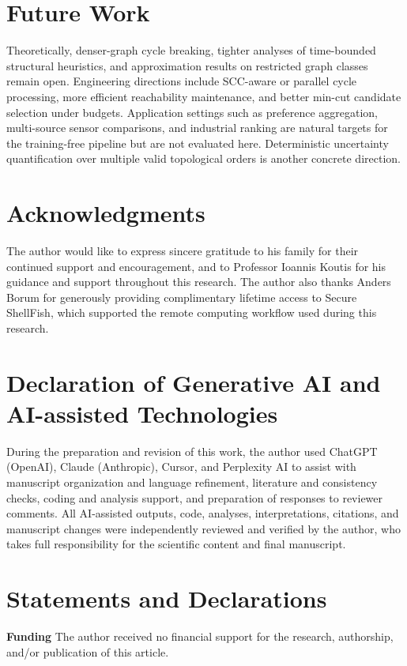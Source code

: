 \documentclass{article}
\begin{document}
\section{Future Work}
\label{sec:future}
Theoretically, denser-graph cycle breaking, tighter analyses of time-bounded structural heuristics, and approximation results on restricted graph classes remain open.
Engineering directions include SCC-aware or parallel cycle processing, more efficient reachability maintenance, and better min-cut candidate selection under budgets.
Application settings such as preference aggregation, multi-source sensor comparisons, and industrial ranking are natural targets for the training-free pipeline but are not evaluated here.
Deterministic uncertainty quantification over multiple valid topological orders is another concrete direction.

\section*{Acknowledgments}
The author would like to express sincere gratitude to his family for their continued support and encouragement, and to Professor Ioannis Koutis for his guidance and support throughout this research. The author also thanks Anders Borum for generously providing complimentary lifetime access to Secure ShellFish, which supported the remote computing workflow used during this research.

\section*{Declaration of Generative AI and AI-assisted Technologies}
During the preparation and revision of this work, the author used ChatGPT (OpenAI), Claude (Anthropic), Cursor, and Perplexity AI to assist with manuscript organization and language refinement, literature and consistency checks, coding and analysis support, and preparation of responses to reviewer comments. All AI-assisted outputs, code, analyses, interpretations, citations, and manuscript changes were independently reviewed and verified by the author, who takes full responsibility for the scientific content and final manuscript.

\section*{Statements and Declarations}

\textbf{Funding}
The author received no financial support for the research, authorship, and/or publication of this article.
\end{document}
